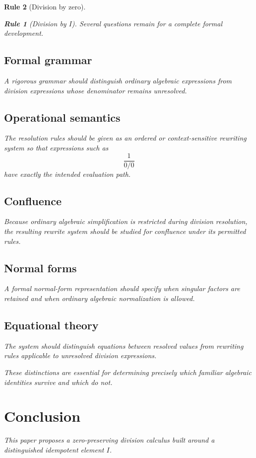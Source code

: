 \documentclass[11pt,a4paper]{article}
\newtheorem{rulethm}{Rule}[section]
\begin{document}
\begin{rulethm}[Division by zero]
\begin{rulethm}[Division by $I$]
Several questions remain for a complete formal development.

\subsection{Formal grammar}

A rigorous grammar should distinguish ordinary algebraic expressions from
division expressions whose denominator remains unresolved.

\subsection{Operational semantics}

The resolution rules should be given as an ordered or context-sensitive
rewriting system so that expressions such as
\[
\frac1{0/0}
\]
have exactly the intended evaluation path.

\subsection{Confluence}

Because ordinary algebraic simplification is restricted during division
resolution, the resulting rewrite system should be studied for confluence
under its permitted rules.

\subsection{Normal forms}

A formal normal-form representation should specify when singular factors
are retained and when ordinary algebraic normalization is allowed.

\subsection{Equational theory}

The system should distinguish equations between resolved values from
rewriting rules applicable to unresolved division expressions.

These distinctions are essential for determining precisely which familiar
algebraic identities survive and which do not.

\section{Conclusion}

This paper proposes a zero-preserving division calculus built around a
distinguished idempotent element $I$.


\end{rulethm}
\end{rulethm}
\end{document}
